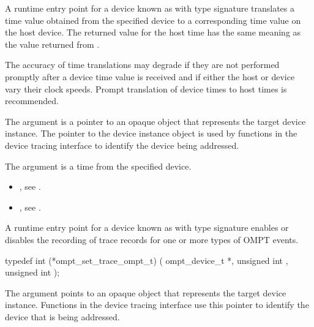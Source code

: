 \descr
A runtime entry point for a device known as 
with type signature  translates
a time value obtained from the specified device to a corresponding time
value on the host device. The returned value for the host time has
the same meaning as the value returned from .

\begin{note}
The accuracy of time translations may degrade if they are not
performed promptly after a device time value is received and if either
the host or device vary their clock speeds. Prompt translation of
device times to host times is recommended.
\end{note}

\argdesc

The argument  is a pointer to an opaque object that
represents the target device instance. The pointer to the device
instance object is used by functions in the device tracing interface
to identify the device being addressed.

The argument  is a time from the specified device.

\crossreferences
\begin{itemize}
\item {},
see .
\item {},
see .
\end{itemize}

\label{sec:ompt_set_trace_ompt_t}

\summary
A runtime entry point for a device known as 
with type signature 
enables or disables the recording of trace records for one or more
types of OMPT events.

\format
\begin{ccppspecific}
\begin{omptInquiry}
typedef int (*ompt_set_trace_ompt_t) (
  ompt_device_t *,
  unsigned int ,
  unsigned int 
);
\end{omptInquiry}
\end{ccppspecific}

\argdesc

The  argument points to an opaque object that represents
the target device instance. Functions in the device tracing interface
use this pointer to identify the device that is being addressed.

